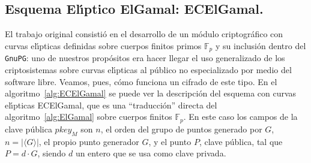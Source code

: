 \documentclass{cedi}%
\def\ces{curvas{} el\'{\i}pticas}%
\newcommand{\Fp}{\ensuremath{\mathbb{F}_p}}%
\theoremstyle{plain}        			%
\theoremstyle{definition}   			%
\theoremstyle{saltolinea}   			%
\begin{document}



\subsection{Esquema El\'{\i}ptico ElGamal: ECElGamal.}

El trabajo original consisti\'o en el desarrollo de un m\'odulo criptogr\'afico con \ces{} definidas sobre cuerpos finitos primos $\Fp$ y su inclusi\'on dentro del \texttt{GnuPG}: uno de nuestros prop\'ositos era hacer llegar el uso generalizado de los criptosistemas sobre \ces{} al p\'ublico no especializado por medio del software libre. Veamos, pues, c\'omo funciona un cifrado de este tipo. En el algoritmo~\ref{alg:ECElGamal} se puede ver la descripci\'on del esquema con \ces{} ECElGamal, que es una ``traducci\'on'' directa del algoritmo~\ref{alg:ElGamal} sobre cuerpos finitos $\Fp$. En este caso los campos de la clave p\'ublica $pkey_M$ son $n$, el orden del grupo de puntos generado por $G$, $n=|\langle G\rangle|$, el propio punto generador $G$, y el punto $P$, clave p\'ublica, tal que $P=d\cdot G$, siendo $d$ un entero que se usa como clave privada.
\end{document}
